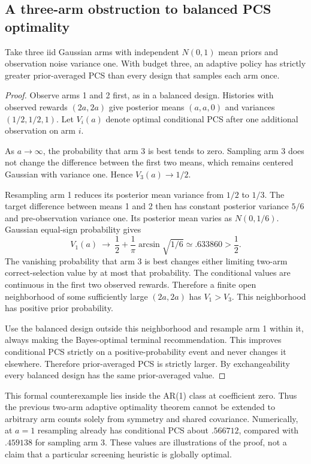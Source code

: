 \subsection{A three-arm obstruction to balanced PCS optimality}
\begin{theorem}
Take three iid Gaussian arms with independent $N(0,1)$ mean priors and observation noise variance one. With budget three, an adaptive policy has strictly greater prior-averaged PCS than every design that samples each arm once.
\end{theorem}
\begin{proof}
Observe arms 1 and 2 first, as in a balanced design. Histories with observed rewards $(2a,2a)$ give posterior means $(a,a,0)$ and variances $(1/2,1/2,1)$. Let $V_i(a)$ denote optimal conditional PCS after one additional observation on arm $i$.

As $a\to\infty$, the probability that arm 3 is best tends to zero. Sampling arm 3 does not change the difference between the first two means, which remains centered Gaussian with variance one. Hence $V_3(a)\to1/2$.

Resampling arm 1 reduces its posterior mean variance from $1/2$ to $1/3$. The target difference between means 1 and 2 then has constant posterior variance $5/6$ and pre-observation variance one. Its posterior mean varies as $N(0,1/6)$. Gaussian equal-sign probability gives
\[
V_1(a)\ \longrightarrow\ \frac12+\frac1\pi\arcsin\sqrt{1/6}
\simeq .633860>\frac12.
\]
The vanishing probability that arm 3 is best changes either limiting two-arm correct-selection value by at most that probability. The conditional values are continuous in the first two observed rewards. Therefore a finite open neighborhood of some sufficiently large $(2a,2a)$ has $V_1>V_3$. This neighborhood has positive prior probability.

Use the balanced design outside this neighborhood and resample arm 1 within it, always making the Bayes-optimal terminal recommendation. This improves conditional PCS strictly on a positive-probability event and never changes it elsewhere. Therefore prior-averaged PCS is strictly larger. By exchangeability every balanced design has the same prior-averaged value.
\end{proof}

This formal counterexample lies inside the AR(1) class at coefficient zero. Thus the previous two-arm adaptive optimality theorem cannot be extended to arbitrary arm counts solely from symmetry and shared covariance. Numerically, at $a=1$ resampling already has conditional PCS about $.566712$, compared with $.459138$ for sampling arm 3. These values are illustrations of the proof, not a claim that a particular screening heuristic is globally optimal.

